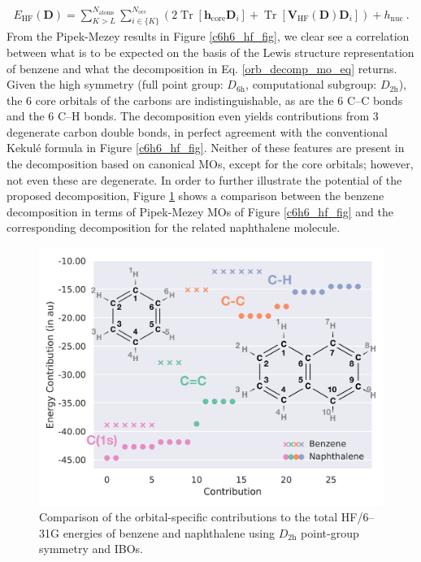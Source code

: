 \documentclass[journal=jctc,manuscript=article]{achemso}
\DeclareMathOperator{\tr}{Tr}
\begin{document}
%
\begin{align}
E_{\text{HF}}(\bm{D}) = \sum^{N_{\text{atoms}}}_{K>L}\sum^{N_{\text{occ}}}_{i \in \{K\}}(2\tr[\bm{h}_{\text{core}}\bm{D}_i] + \tr[\bm{V}_{\text{HF}}(\bm{D})\bm{D}_i]) + h_{\text{nuc}} \ . \label{orb_decomp_bond_eq}
\end{align}
%
From the Pipek-Mezey results in Figure \ref{c6h6_hf_fig}, we clear see a correlation between what is to be expected on the basis of the Lewis structure representation of benzene and what the decomposition in Eq. \ref{orb_decomp_mo_eq} returns. Given the high symmetry (full point group: $D_{6\text{h}}$, computational subgroup: $D_{2\text{h}}$), the 6 core orbitals of the carbons are indistinguishable, as are the 6 C--C bonds and the 6 C--H bonds. The decomposition even yields contributions from 3 degenerate carbon double bonds, in perfect agreement with the conventional Kekul{\'e} formula in Figure \ref{c6h6_hf_fig}. Neither of these features are present in the decomposition based on canonical MOs, except for the core orbitals; however, not even these are degenerate. In order to further illustrate the potential of the proposed decomposition, Figure \ref{c10h8_hf_fig} shows a comparison between the benzene decomposition in terms of Pipek-Mezey MOs of Figure \ref{c6h6_hf_fig} and the corresponding decomposition for the related naphthalene molecule.\\
%
\begin{figure}[ht]
\begin{center}
\includegraphics[width=\textwidth]{figures/c6h6_c10h8_hf_2.pdf}
\caption{Comparison of the orbital-specific contributions to the total HF/6--31G energies of benzene and naphthalene using $D_{2\text{h}}$ point-group symmetry and IBOs.}
\label{c10h8_hf_fig}
\end{center}
\end{figure}
%
\end{document}
